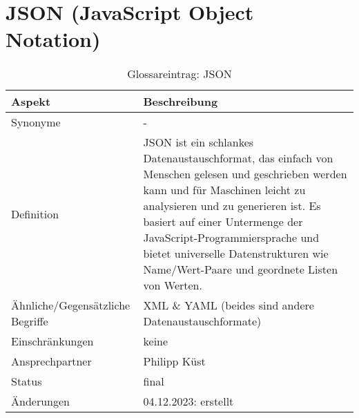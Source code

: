 \section*{JSON (JavaScript Object Notation)}\label{sec:glossar_json}
\begin{table}[H]
    \label{tab:glossar_json}
    \begin{tabularx}{\textwidth}{|l|X|}
        \hline
        \textbf{Aspekt}                  & \textbf{Beschreibung}                                  \\
        \hline
        Synonyme                         & -                                                      \\
        \hline
        Definition & JSON ist ein schlankes Datenaustauschformat, das einfach von Menschen gelesen und geschrieben werden kann und für Maschinen leicht zu analysieren und zu generieren ist.
        Es basiert auf einer Untermenge der JavaScript-Programmiersprache und bietet universelle Datenstrukturen wie Name/Wert-Paare und geordnete Listen von Werten. \\
        \hline
        Ähnliche/Gegensätzliche Begriffe & XML \& YAML (beides sind andere Datenaustauschformate) \\
        \hline
        Einschränkungen                  & keine                                                  \\
        \hline
        Ansprechpartner                  & Philipp Küst                                           \\
        \hline
        Status                           & final                                                  \\
        \hline
        Änderungen                       & 04.12.2023: erstellt                                   \\
        \hline
    \end{tabularx}
    \caption{Glossareintrag: JSON}
\end{table}


